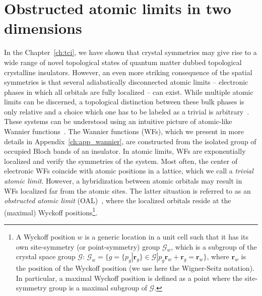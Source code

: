 \chapter{Obstructed atomic limits in two dimensions}
\label{ch:oals}
In the Chapter~\ref{ch:tci}, we have shown that crystal symmetries may give rise to a wide range of novel topological states of quantum matter dubbed topological crystalline insulators. However, an even more striking consequence of the spatial symmetries is that several adiabatically disconnected atomic limits -- electronic phases in which all orbitals are fully localized -- can exist. While multiple atomic limits can be discerned, a topological distinction between these bulk phases is only relative and a choice which one has to be labeled as a trivial is arbitrary~\cite{PhysRevLett.114.177204}. These systems can be understood using an intuitive picture of atomic-like Wannier functions~\cite{PhysRev.52.191, MarziariWF2012}. The Wannier functions (WFs), which we present in more details in Appendix~\ref{ch:app_wannier}, are constructed from the isolated group of occupied Bloch bands of an insulator. In atomic limits, WFs are exponentially localized and verify the symmetries of the system. Most often, the center of electronic WFs coincide with atomic positions in a lattice, which we call a \emph{trivial atomic limit}. However, a hybridization between atomic orbitals may result in WFs localized far from the atomic sites. The latter situation is referred to as an \emph{obstructed atomic limit} (OAL)~\cite{Bradlyn17}, where the localized orbitals reside at the (maximal) Wyckoff positions\footnote{A Wyckoff position $w$ is a generic location in a unit cell such that it has its own site-symmetry (or point-symmetry) group $\mathcal{G}_w$, which is a subgroup of the crystal space group $\mathcal{G}$: $\mathcal{G}_w = \lbrace g = \lbrace p_g | \mathbf{r}_g \rbrace \in \mathcal{G} |  p_g \mathbf{r}_w + \mathbf{r}_g = \mathbf{r}_w \rbrace$, where $\mathbf{r}_w$ is the position of the Wyckoff position (we use here the Wigner-Seitz notation). In particular, a maximal Wyckoff position is defined as a point where the site-symmetry group is a maximal subgroup of $\mathcal{G}$.}. 

